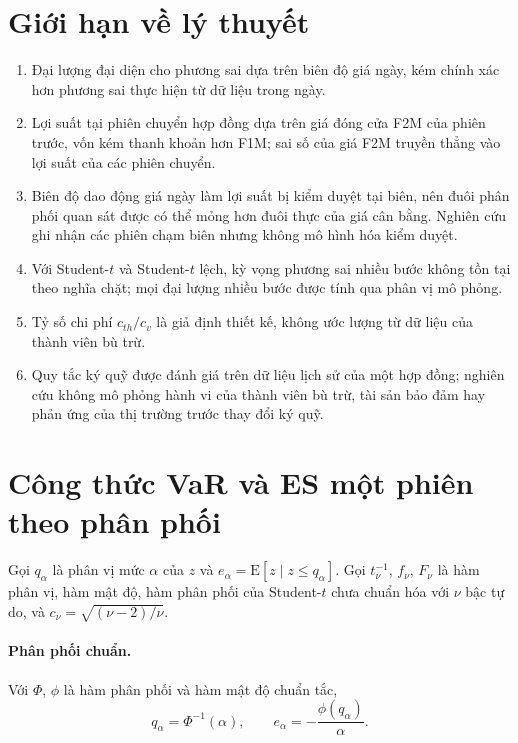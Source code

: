 \documentclass[12pt,a4paper]{article}
\theoremstyle{definition}
\theoremstyle{remark}
\newcommand{\E}{\mathrm{E}}
\begin{document}
\section{Giới hạn về lý thuyết}\label{sec:gioihan}

\begin{enumerate}
\item Đại lượng đại diện cho phương sai dựa trên biên độ giá ngày, kém chính xác hơn phương sai thực hiện từ dữ liệu trong ngày.
\item Lợi suất tại phiên chuyển hợp đồng dựa trên giá đóng cửa F2M của phiên trước, vốn kém thanh khoản hơn F1M; sai số của giá F2M truyền thẳng vào lợi suất của các phiên chuyển. 
\item Biên độ dao động giá ngày làm lợi suất bị kiểm duyệt tại biên, nên đuôi phân phối quan sát được có thể mỏng hơn đuôi thực của giá cân bằng. Nghiên cứu ghi nhận các phiên chạm biên nhưng không mô hình hóa kiểm duyệt.
\item Với Student-$t$ và Student-$t$ lệch, kỳ vọng phương sai nhiều bước không tồn tại theo nghĩa chặt; mọi đại lượng nhiều bước được tính qua phân vị mô phỏng.
\item Tỷ số chi phí $c_{th}/c_v$ là giả định thiết kế, không ước lượng từ dữ liệu của thành viên bù trừ.
\item Quy tắc ký quỹ được đánh giá trên dữ liệu lịch sử của một hợp đồng; nghiên cứu không mô phỏng hành vi của thành viên bù trừ, tài sản bảo đảm hay phản ứng của thị trường trước thay đổi ký quỹ.
\end{enumerate}

\appendix
\section{Công thức VaR và ES một phiên theo phân phối}\label{app:varES}

Gọi $q_\alpha$ là phân vị mức $\alpha$ của $z$ và $e_\alpha=\E[z\mid z\le q_\alpha]$. Gọi $t_\nu^{-1}$, $f_\nu$, $F_\nu$ là hàm phân vị, hàm mật độ, hàm phân phối của Student-$t$ chưa chuẩn hóa với $\nu$ bậc tự do, và $c_\nu=\sqrt{(\nu-2)/\nu}$.

\paragraph{Phân phối chuẩn.} Với $\Phi$, $\phi$ là hàm phân phối và hàm mật độ chuẩn tắc,
\begin{equation}
q_\alpha=\Phi^{-1}(\alpha),\qquad e_\alpha=-\frac{\phi(q_\alpha)}{\alpha}.
\end{equation}
\end{document}
